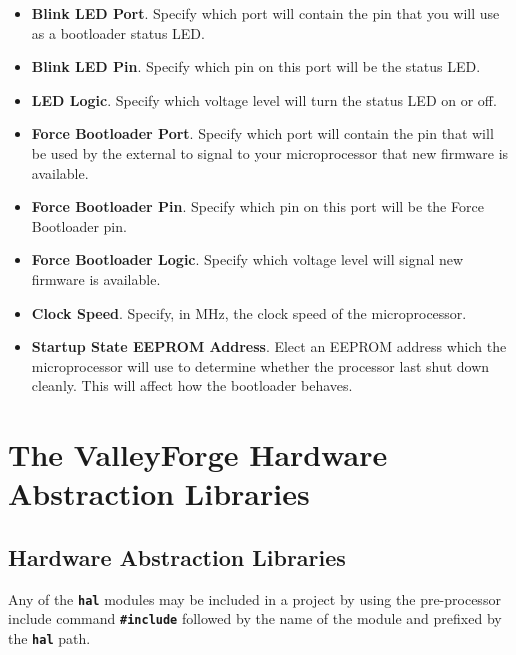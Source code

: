 \documentclass[a4paper, oneside, 11pt, titlepage, onecolumn, openright]{report}
\begin{document}
			\begin{itemize}

				\item \textbf{Blink LED Port}. Specify which port will contain the pin that you will use as a bootloader status LED.

				\item \textbf{Blink LED Pin}. Specify which pin on this port will be the status LED.

				\item \textbf{LED Logic}. Specify which voltage level will turn the status LED on or off.

				\item \textbf{Force Bootloader Port}. Specify which port will contain the pin that will be used by the external to signal to your microprocessor that new firmware is available.

				\item \textbf{Force Bootloader Pin}. Specify which pin on this port will be the Force Bootloader pin.

				\item \textbf{Force Bootloader Logic}. Specify which voltage level will signal new firmware is available.

				\item \textbf{Clock Speed}. Specify, in MHz, the clock speed of the microprocessor.

				\item \textbf{Startup State EEPROM Address}. Elect an EEPROM address which the microprocessor will use to determine whether the processor last shut down cleanly. This will affect how the bootloader behaves.

			\end{itemize}

	\part{The ValleyForge Hardware Abstraction Libraries}
		\label{part:hal}

		\chapter{Hardware Abstraction Libraries}
			\label{c:Hardware Abstraction Libraries}
			
			Any of the \textbf{\texttt{hal}} modules may be included in a project by using the pre-processor include command \textbf{\texttt{\#include}} followed by the name of the module and prefixed by the \textbf{\texttt{hal}} path.
			
\end{document}
